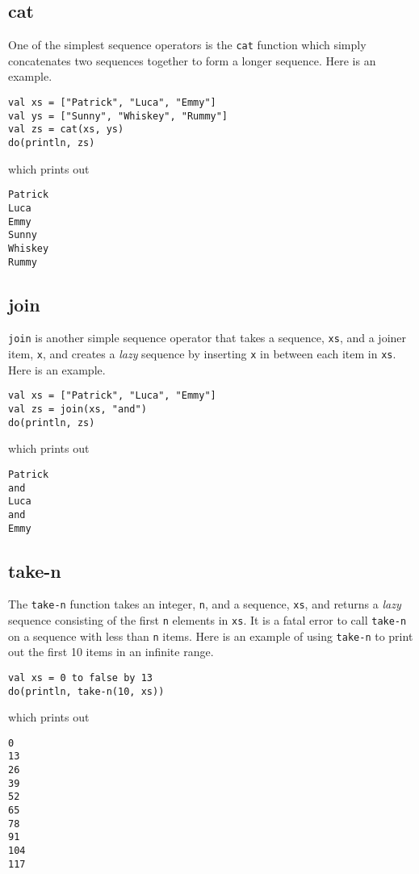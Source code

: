 \documentclass[10pt,oneside]{book}
\begin{document}
\subsection*{cat}
One of the simplest sequence operators is the \texttt{\frenchspacing cat} function which simply concatenates two sequences together to form a longer sequence.
Here is an example.
\begin{lstlisting}
val xs = ["Patrick", "Luca", "Emmy"]
val ys = ["Sunny", "Whiskey", "Rummy"]
val zs = cat(xs, ys)
do(println, zs)
\end{lstlisting}
which prints out
\begin{lstlisting}
Patrick
Luca
Emmy
Sunny
Whiskey
Rummy
\end{lstlisting}

\subsection*{join}
\texttt{\frenchspacing join} is another simple sequence operator that takes a sequence, \texttt{\frenchspacing xs}, and a joiner item, \texttt{\frenchspacing x}, and creates a {\em lazy} sequence by inserting \texttt{\frenchspacing x} in between each item in \texttt{\frenchspacing xs}.
Here is an example.
\begin{lstlisting}
val xs = ["Patrick", "Luca", "Emmy"]
val zs = join(xs, "and")
do(println, zs)
\end{lstlisting}
which prints out
\begin{lstlisting}
Patrick
and
Luca
and
Emmy
\end{lstlisting}

\subsection*{take-n}
The \texttt{\frenchspacing take-n} function takes an integer, \texttt{\frenchspacing n}, and a sequence, \texttt{\frenchspacing xs}, and returns a {\em lazy} sequence consisting of the first \texttt{\frenchspacing n} elements in \texttt{\frenchspacing xs}. It is a fatal error to call \texttt{\frenchspacing take-n} on a sequence with less than \texttt{\frenchspacing n} items.
Here is an example of using \texttt{\frenchspacing take-n} to print out the first 10 items in an infinite range.
\begin{lstlisting}
val xs = 0 to false by 13
do(println, take-n(10, xs))
\end{lstlisting}
which prints out
\begin{lstlisting}
0
13
26
39
52
65
78
91
104
117
\end{lstlisting}
\end{document}
